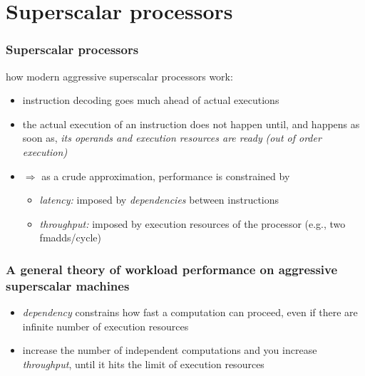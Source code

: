 \documentclass[12pt,dvipdfmx]{beamer}
\newcommand{\ao}[1]{{\color{blue}#1}}
\begin{document}
\section{Superscalar processors}

\begin{frame}
  \frametitle{Superscalar processors}
  how modern aggressive superscalar processors work:
\begin{itemize}
\item<2-> instruction decoding goes much ahead of actual executions
\item<3-> the actual execution of an instruction
  does not happen until, and happens as soon as,
  \ao{\emph{its operands and execution resources are ready}}
  \emph{(out of order execution)}
\item<4-> $\Rightarrow$ as a crude approximation,
  performance is constrained by 
  \begin{itemize}
  \item<5-> \ao{\emph{latency:}} imposed by {\it dependencies}
    between instructions
  \item<6-> \ao{\emph{throughput:}}
    imposed by execution resources of the processor
    (e.g., two fmadds/cycle)
  \end{itemize}
\end{itemize}
\end{frame}

\begin{frame}
  \frametitle{A general theory of workload performance on aggressive superscalar machines}
  \begin{itemize}
  \item \ao{\it dependency} constrains how fast a computation can proceed,
    even if there are infinite number of execution resources
    
  \item increase the number of independent computations and
    you increase \ao{\it throughput}, until it hits the limit
    of execution resources

\begin{center}
  {\scriptsize }
\end{center}
  \end{itemize}
\end{frame}
\end{document}
